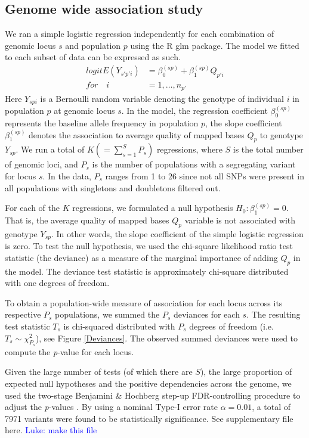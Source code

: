 \documentclass[9pt,lineno]{elife}
\newcommand{\luke}[1]{\textcolor{blue}{Luke: #1}}
\begin{document}
\subsection{Genome wide association study}
We ran a simple logistic regression independently for each combination of genomic locus $s$ and population $p$ using the R glm package\citep{RDevelopmentCoreTeam2016}. The model we fitted to each subset of data can be expressed as such.
\begin{align*}
{logit}{E(Y_{s'p'i})} &= \beta_{0}^{(sp)} + \beta_{1}^{(sp)} Q_{p'i}
\\
\textit{for}\quad i &= 1,\hdots, n_{p'}
\end{align*}
Here $Y_{spi}$ is a Bernoulli random variable denoting the genotype of individual $i$ in population $p$ at genomic locus $s$. 
In the model, the regression coefficient $\beta_{0}^{(sp)}$ represents the baseline allele frequency in population $p$, the slope coefficient $\beta_{1}^{(sp)}$ denotes the association to average quality of mapped bases $Q_{p}$ to genotype $Y_{sp}$. 
We run a total of $K (= \sum_{s=1}^S P_s)$ regressions, where $S$ is the total number of genomic loci, and $P_s$ is the number of populations with a segregating variant for locus $s$. 
In the data, $P_s$ ranges from 1 to 26 since not all SNPs were present in all populations with singletons and doubletons filtered out.

For each of the $K$ regressions, we formulated a null hypothesis $H_{0}: \beta_{1}^{(sp)}=0$. That is, the average quality of mapped bases $Q_{p}$ variable is not associated with genotype $Y_{sp}$.
In other words, the slope coefficient of the simple logistic regression is zero.
To test the null hypothesis, we used the chi-square likelihood ratio test statistic (the deviance) as a measure of the marginal importance of adding $Q_{p}$ in the model. 
The deviance test statistic is approximately chi-square distributed with one degrees of freedom.  

To obtain a population-wide measure of association for each locus across its respective $P_s$ populations, we summed the $P_s$ deviances for each $s$. The resulting test statistic $T_s$ is chi-squared distributed with $P_s$ degrees of freedom (i.e. $T_s \sim \chi^2_{P_s}$), see Figure \ref{Deviances}.
The observed summed deviances were used to compute the \textit{p}-value for each locus.


Given the large number of tests (of which there are $S$), the large proportion of expected null hypotheses and the positive dependencies across the genome, we used the two-stage Benjamini \& Hochberg step-up FDR-controlling procedure to adjust the \textit{p}-values \citep{Benjamini2006}.
By using a nominal Type-I error rate $\alpha = 0.01$, a total of 7971 variants were found to be statistically significance. See supplementary file {here}. \luke{make this file}
\end{document}
